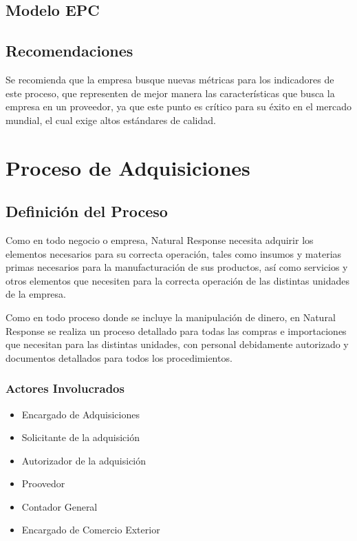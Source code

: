 \documentclass[12pt,letterpaper]{article}
\begin{document}
\subsection{Modelo EPC}

\subsection{Recomendaciones}
Se recomienda que la empresa busque nuevas métricas para los indicadores de este proceso, que representen de mejor manera las características que busca la empresa en un proveedor, ya que este punto es crítico para su éxito en el mercado mundial, el cual exige altos estándares de calidad.

\section{Proceso de Adquisiciones}

\subsection{Definición del Proceso}
Como en todo negocio o empresa, Natural Response necesita adquirir los elementos necesarios para su correcta operación, tales como insumos y materias primas necesarios para la manufacturación de sus productos, así como servicios y otros elementos que necesiten para la correcta operación de las distintas unidades de la empresa.

Como en todo proceso donde se incluye la manipulación de dinero, en Natural Response se realiza un proceso detallado para todas las compras e importaciones que necesitan para las distintas unidades, con personal debidamente autorizado y documentos detallados para todos los procedimientos.

\subsubsection{Actores Involucrados}
\begin{itemize}
\item Encargado de Adquisiciones
\item Solicitante de la adquisición
\item Autorizador de la adquisición
\item Proovedor
\item Contador General
\item Encargado de Comercio Exterior
\end{itemize}
\end{document}

